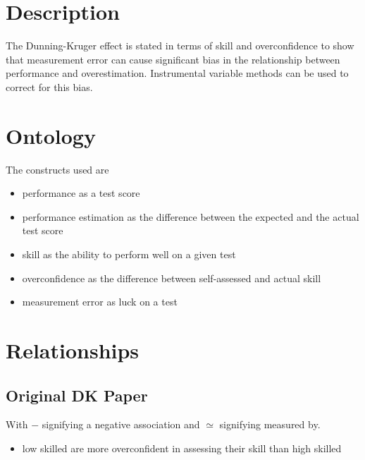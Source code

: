 \documentclass[a4paper,11pt]{article}
\newcommand{\1}{\mathbf{1}}
\begin{document}
\section{Description}
The Dunning-Kruger effect is stated in terms of skill and overconfidence to show that measurement error can cause significant bias in the relationship between performance and overestimation.
Instrumental variable methods can be used to correct for this bias.

\section{Ontology}
The constructs used are
\begin{itemize}
 \item performance as a test score
 \item performance estimation as the difference between the expected and the actual test score
 \item skill as the ability to perform well on a given test
 \item overconfidence as the difference between self-assessed and actual skill
 \item measurement error as luck on a test
\end{itemize}

\section{Relationships}

\subsection{Original DK Paper}

\begin{figure}[ht]
  \vspace{1cm}
  \begin{center}
  
  \end{center}
  \label{fig:typetree}
\end{figure}

With $-$ signifying a negative association and $\simeq$ signifying measured by.

\begin{itemize}
 \item low skilled are more overconfident in assessing their skill than high skilled
\end{itemize}
\end{document}

